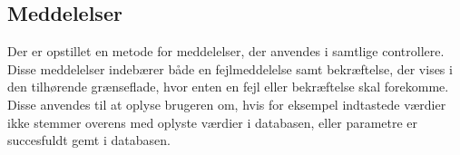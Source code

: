 \newpage
\subsection*{Meddelelser}
Der er opstillet en metode for meddelelser, der anvendes i samtlige controllere. Disse meddelelser indebærer både en fejlmeddelelse samt bekræftelse, der vises i den tilhørende grænseflade, hvor enten en fejl eller bekræftelse skal forekomme.
Disse anvendes til at oplyse brugeren om, hvis for eksempel indtastede værdier ikke stemmer overens med oplyste værdier i databasen, eller parametre er succesfuldt gemt i databasen.  